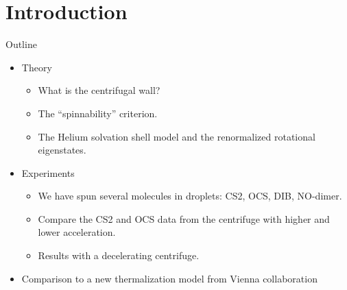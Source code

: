 \section{Introduction}

\begin{frame}{Outline}
  \begin{itemize}
    \item Theory
      \begin{itemize}
        \item What is the centrifugal wall?
        \item The ``spinnability'' criterion.
        \item The Helium solvation shell model and the renormalized rotational eigenstates.
      \end{itemize}
    \item Experiments
      \begin{itemize}
        \item We have spun several molecules in droplets: CS2, OCS, DIB, NO-dimer. 
        \item Compare the CS2 and OCS data from the centrifuge with higher and lower acceleration. 
        \item Results with a decelerating centrifuge. 
      \end{itemize}
    \item Comparison to a new thermalization model from Vienna collaboration
  \end{itemize}
\end{frame}
